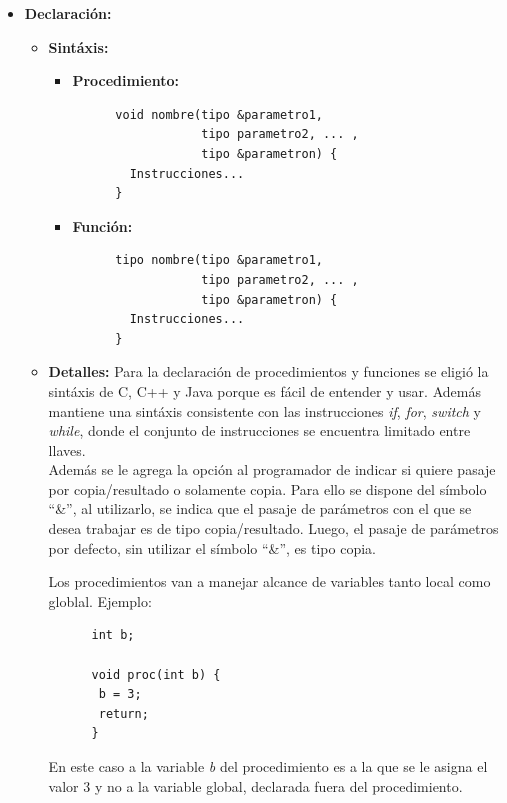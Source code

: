 \documentclass[11pt, spanish]{report}
\begin{document}
\begin{itemize}
\item \textbf{Declaraci\'on:}
  \begin{itemize}
  \item \textbf{Sint\'axis:}
    \begin{itemize}
    \item \textbf{Procedimiento:} \begin{verbatim}
      void nombre(tipo &parametro1,
                  tipo parametro2, ... ,
                  tipo &parametron) {
        Instrucciones...
      } \end{verbatim}
    \item \textbf{Funci\'on:} \begin{verbatim}
      tipo nombre(tipo &parametro1,
                  tipo parametro2, ... ,
                  tipo &parametron) {
        Instrucciones...
      } \end{verbatim}
    \end{itemize}
  \item \textbf{Detalles:}
    Para la declaraci\'on de procedimientos y funciones se eligi\'o la sint\'axis de C, C++ y Java porque es f\'acil de entender y usar. 
    Adem\'as mantiene una sint\'axis consistente con las instrucciones \emph{if}, \emph{for}, \emph{switch} y \emph{while}, donde el conjunto
    de instrucciones se encuentra limitado entre llaves.\\

    Adem\'as se le agrega la opci\'on al programador de indicar si quiere pasaje por copia/resultado o solamente copia. Para ello se dispone 
    del s\'imbolo ``\&'', al utilizarlo, se indica que el pasaje de par\'ametros con el que se desea trabajar es de tipo copia/resultado. Luego, el
    pasaje de par\'ametros por defecto, sin utilizar el s\'imbolo ``\&'', es tipo copia.

    Los procedimientos van a manejar alcance de variables tanto local como globlal. Ejemplo:

    \begin{verbatim}
      int b;
      
      void proc(int b) {
       b = 3;
       return;
      }
    \end{verbatim}

    En este caso a la variable \emph{b} del procedimiento es a la que se le asigna el valor 3 y no a la variable global, declarada fuera del procedimiento.\\
    

\end{itemize}
\end{itemize}
\end{document}
